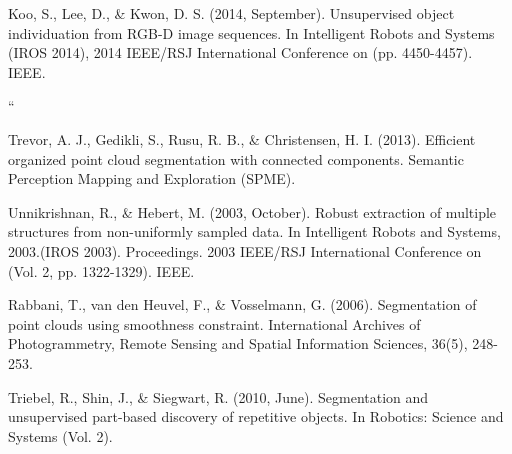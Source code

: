 \documentclass[]{article}
\begin{document}
\begin{thebibliography}{99}
            \newblock Koo, S., Lee, D., \& Kwon, D. S. (2014, September). Unsupervised object individuation from RGB-D image sequences. In Intelligent Robots and Systems (IROS 2014), 2014 IEEE/RSJ International Conference on (pp. 4450-4457). IEEE.



            ``

            \newblock Trevor, A. J., Gedikli, S., Rusu, R. B., \& Christensen, H. I. (2013). Efficient organized point cloud segmentation with connected components. Semantic Perception Mapping and Exploration (SPME).

            \newblock Unnikrishnan, R., \& Hebert, M. (2003, October). Robust extraction of multiple structures from non-uniformly sampled data. In Intelligent Robots and Systems, 2003.(IROS 2003). Proceedings. 2003 IEEE/RSJ International Conference on (Vol. 2, pp. 1322-1329). IEEE. 

            \newblock Rabbani, T., van den Heuvel, F., \& Vosselmann, G. (2006). Segmentation of point clouds using smoothness constraint. International Archives of Photogrammetry, Remote Sensing and Spatial Information Sciences, 36(5), 248-253.

            \newblock Triebel, R., Shin, J., \& Siegwart, R. (2010, June). Segmentation and unsupervised part-based discovery of repetitive objects. In Robotics: Science and Systems (Vol. 2).


\end{thebibliography}
\end{document}
